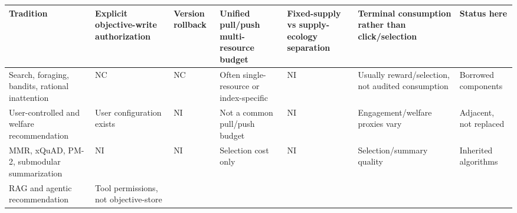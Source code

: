 \documentclass[
  11pt]{article}
\begin{document}
\begin{longtable}[]{@{}
  >{\raggedright\arraybackslash}p{}
  >{\raggedright\arraybackslash}p{}
  >{\raggedright\arraybackslash}p{}
  >{\raggedright\arraybackslash}p{}
  >{\raggedright\arraybackslash}p{}
  >{\raggedright\arraybackslash}p{}
  >{\raggedright\arraybackslash}p{}@{}}
\toprule\noalign{}
\begin{minipage}[b]{\linewidth}\raggedright
Tradition
\end{minipage} & \begin{minipage}[b]{\linewidth}\raggedright
Explicit objective-write authorization
\end{minipage} & \begin{minipage}[b]{\linewidth}\raggedright
Version rollback
\end{minipage} & \begin{minipage}[b]{\linewidth}\raggedright
Unified pull/push multi-resource budget
\end{minipage} & \begin{minipage}[b]{\linewidth}\raggedright
Fixed-supply vs supply-ecology separation
\end{minipage} & \begin{minipage}[b]{\linewidth}\raggedright
Terminal consumption rather than click/selection
\end{minipage} & \begin{minipage}[b]{\linewidth}\raggedright
Status here
\end{minipage} \\
\midrule\noalign{}
\endhead
\bottomrule\noalign{}
\endlastfoot
Search, foraging, bandits, rational inattention & NC & NC & Often
single-resource or index-specific & NI & Usually reward/selection, not
audited consumption & Borrowed components \\
User-controlled and welfare recommendation & User configuration exists &
NI & Not a common pull/push budget & NI & Engagement/welfare proxies
vary & Adjacent, not replaced \\
MMR, xQuAD, PM-2, submodular summarization & NI & NI & Selection cost
only & NI & Selection/summary quality & Inherited algorithms \\
RAG and agentic recommendation & Tool permissions, not objective-store

\end{longtable}
\end{document}
